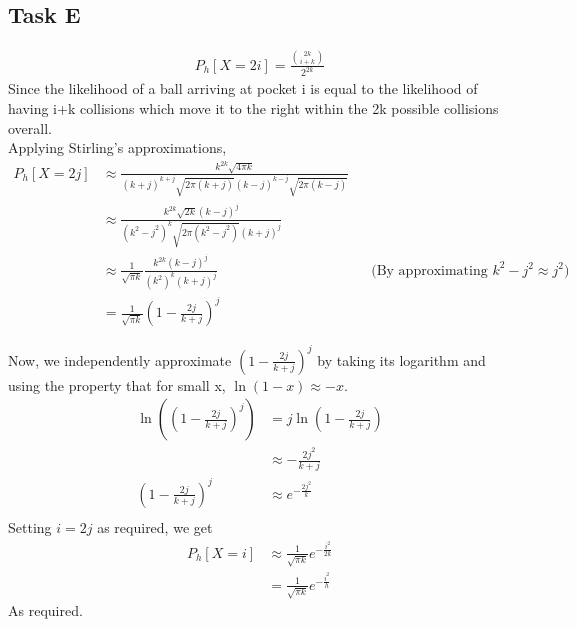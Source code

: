 \subsection{Task E}
\begin{align*}
    P_h[X=2i]=\frac{{{2k}\choose{i+k}}}{2^{2k}}
\end{align*}
Since the likelihood of a ball arriving at pocket i is equal to the likelihood of having i+k collisions which move it to the right within the 2k possible collisions overall.\\
Applying Stirling's approximations,
\begin{align*}
    P_h[X=2j] &\approx \frac{k^{2k}\sqrt{4\pi k}}{(k+j)^{k+j}\sqrt{2\pi (k+j)}(k-j)^{k-j}\sqrt{2\pi (k-j)}}\\
    &\approx \frac{k^{2k}\sqrt{2k}(k-j)^j}{(k^2-j^2)^{k}\sqrt{2\pi (k^2-j^2)}(k+j)^j}\\
    &\approx \frac{1}{\sqrt{\pi k}}\frac{k^{2k}(k-j)^{j}}{(k^2)^k(k+j)^{j}} && \text{(By approximating $k^2 - j^2 \approx j^2$)}\\
    &= \frac{1}{\sqrt{\pi k}}\left(1-\frac{2j}{k+j}\right)^j
\end{align*}

Now, we independently approximate $\left(1-\frac{2j}{k+j}\right)^j$ by taking its logarithm and using the property that for small x, $\ln(1-x) \approx -x$.
\begin{align*}
    \ln\left(\left(1-\frac{2j}{k+j}\right)^j\right) &= j\ln\left(1-\frac{2j}{k+j}\right)\\
    &\approx -\frac{2j^2}{k+j}\\
    \left(1-\frac{2j}{k+j}\right)^j&\approx e^{-\frac{2j^2}{k}}\\
\end{align*}
Setting $i=2j$ as required, we get 
\begin{align*}
    P_h[X=i]&\approx \frac{1}{\sqrt{\pi k}}e^{-\frac{i^2}{2k}}\\
    &= \frac{1}{\sqrt{\pi k}}e^{-\frac{i^2}{h}}
\end{align*}
As required.